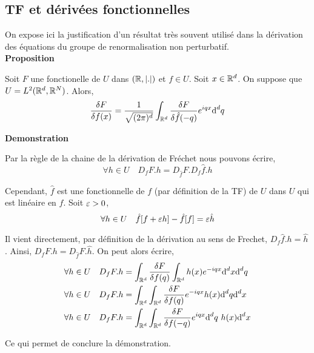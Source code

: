 \documentclass[10pt]{article}
\begin{document}
\begin{multicols}{2}
\vspace*{11pt}







\vspace*{11pt}

\subsection{TF et dérivées fonctionnelles}


On expose ici la justification d'un résultat très souvent utilisé dans la dérivation des équations du groupe de renormalisation non perturbatif.\\ 

\textbf{Proposition}

Soit $F$ une fonctionelle de $U$ dans $(\mathbb{R},|.|)$ et $f \in U$.
Soit $x \in \mathbb{R}^d$. On suppose que $U = L^2(\mathbb{R}^d, \mathbb{R}^N)$. 
Alors, 
\begin{equation}
  \frac{\delta F}{\delta f(x)} = \frac{1}{\sqrt{(2\pi)^d}} \int_{\mathbb{R}^d} \frac{\delta F}{\delta \hat{f}(-q)} e^{iqx} \text{d}^d q
\end{equation} 


\vspace*{11pt}
\textbf{Demonstration}

Par la règle de la chaine de la dérivation de Fréchet nous pouvons écrire, 
\begin{equation}
  \forall h \in U \quad D_fF.h = D_{\hat{f}}F. D_f \hat{f}.h
\end{equation}



Cependant, $\hat{f}$ est une fonctionnelle de $f$ (par définition de la TF) de $U$ dans $U$ qui est linéaire en $f$. Soit $\varepsilon >0$, 
\begin{equation}
  \forall h \in U \quad \hat{f}[f + \varepsilon h] - \hat{f}[f] = \varepsilon \hat{h} 
\end{equation} 

Il vient directement, par définition de la dérivation au sens de Frechet, $D_f\hat{f} .h = \hat{h}$.  
Ainsi,  $D_f F .h = D_{\hat{f}}F.\hat{h}$.  On peut alors écrire, 
\begin{align}
  \forall h \in U  \quad D_f F .h & = \int_{\mathbb{R}^d} \frac{\delta F}{\delta f(q)} \int_{\mathbb{R}^d} h(x) e^{-iqx} \text{d}^d x \text{d}^d q \\
  \forall h \in U  \quad D_f F .h & = \int_{\mathbb{R}^d} \int_{\mathbb{R}^d} \frac{\delta F}{\delta f(q)} e^{-iqx} h(x) \text{d}^d q \text{d}^d x \\
  \forall h \in U  \quad D_f F .h & = \int_{\mathbb{R}^d} \int_{\mathbb{R}^d} \frac{\delta F}{\delta f(-q)} e^{iqx} \text{d}^d q \text{ } h(x) \text{d}^d x
\end{align}

Ce qui permet de conclure la démonstration.

\vspace*{11pt}

\end{multicols}
\end{document}
